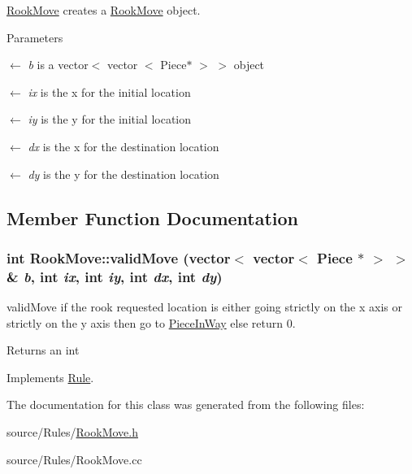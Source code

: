 \hyperlink{classRookMove}{RookMove} creates a \hyperlink{classRookMove}{RookMove} object. 
\begin{DoxyParams}{Parameters}
\item[\mbox{$\leftarrow$} {\em b}]is a vector$<$ vector $<$ Piece$\ast$ $>$ $>$ object \item[\mbox{$\leftarrow$} {\em ix}]is the x for the initial location \item[\mbox{$\leftarrow$} {\em iy}]is the y for the initial location \item[\mbox{$\leftarrow$} {\em dx}]is the x for the destination location \item[\mbox{$\leftarrow$} {\em dy}]is the y for the destination location \end{DoxyParams}


\subsection{Member Function Documentation}
\hypertarget{classRookMove_a3b985caef5be53996c71ff3427816b68}{
\subsubsection[{validMove}]{\setlength{\rightskip}{0pt plus 5cm}int RookMove::validMove (vector$<$ vector$<$ {\bf Piece} $\ast$ $>$ $>$ \& {\em b}, \/  int {\em ix}, \/  int {\em iy}, \/  int {\em dx}, \/  int {\em dy})}}
\label{classRookMove_a3b985caef5be53996c71ff3427816b68}


validMove if the rook requested location is either going strictly on the x axis or strictly on the y axis then go to \hyperlink{classPieceInWay}{PieceInWay} else return 0. \begin{DoxyReturn}{Returns}
an int 
\end{DoxyReturn}


Implements \hyperlink{classRule}{Rule}.

The documentation for this class was generated from the following files:\begin{DoxyCompactItemize}
\item 
source/Rules/\hyperlink{RookMove_8h}{RookMove.h}\item 
source/Rules/RookMove.cc\end{DoxyCompactItemize}
